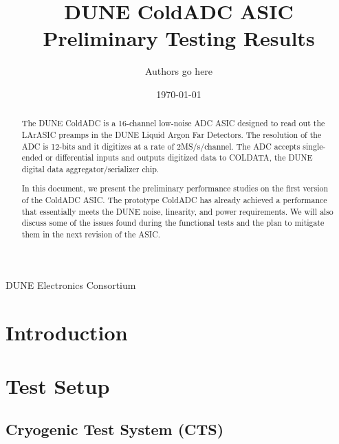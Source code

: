\documentclass[10pt]{article}
\begin{document}

\title{DUNE ColdADC ASIC Preliminary Testing Results}

\date{\today}
\author{Authors go here}
%	
%	

\maketitle

\centerline{DUNE Electronics Consortium}



\begin{abstract}
The DUNE ColdADC is a 16-channel low-noise ADC ASIC designed to read out the LArASIC preamps in the DUNE Liquid Argon Far Detectors. The resolution of the ADC is 12-bits and it digitizes at a rate of 2MS/s/channel. The ADC accepts single-ended or differential inputs and outputs digitized data to COLDATA, the DUNE digital data aggregator/serializer chip.

In this document, we present the preliminary performance studies on the first version of the ColdADC ASIC. The prototype ColdADC has already achieved a performance that essentially meets the DUNE noise, linearity, and power requirements. We will also discuss some of the issues found during the functional tests and the plan to mitigate them in the next revision of the ASIC.
\end{abstract}


\newpage
\tableofcontents

\newpage

\section{Introduction}




\section{Test Setup}

\subsection{Cryogenic Test System (CTS) }

\end{document}

